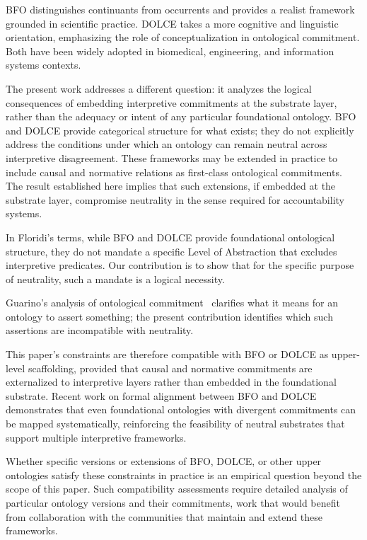 BFO distinguishes continuants from occurrents
and provides a realist framework grounded in scientific practice.
DOLCE takes a more cognitive and linguistic orientation,
emphasizing the role of conceptualization in ontological commitment.
Both have been widely adopted in biomedical, engineering,
and information systems contexts.

The present work addresses a different question:
it analyzes the logical consequences
of embedding interpretive commitments at the substrate layer,
rather than the adequacy or intent
of any particular foundational ontology.
BFO and DOLCE provide categorical structure for what exists;
they do not explicitly address the conditions under which
an ontology can remain neutral across interpretive disagreement.
These frameworks may be extended in practice
to include causal and normative relations
as first-class ontological commitments.
The result established here
implies that such extensions, if embedded at the substrate layer,
compromise neutrality in the sense required for accountability systems.

In Floridi's terms, while BFO and DOLCE provide
foundational ontological structure,
they do not mandate a specific Level of Abstraction
that excludes interpretive predicates.
Our contribution is to show that for the
specific purpose of neutrality,
such a mandate is a logical necessity.

Guarino's analysis of ontological commitment~\citep{guarino2009ontology}
clarifies what it means for an ontology to assert something;
the present contribution identifies which such assertions
are incompatible with neutrality.

This paper's constraints are therefore compatible
with BFO or DOLCE
as upper-level scaffolding,
provided that causal and normative commitments are externalized
to interpretive layers rather than embedded in the foundational substrate.
Recent work on formal alignment between BFO and DOLCE~\citep{masolo2025alignment}
demonstrates that even foundational ontologies with divergent commitments
can be mapped systematically,
reinforcing the feasibility of neutral substrates
that support multiple interpretive frameworks.

Whether specific versions or extensions of BFO, DOLCE,
or other upper ontologies satisfy these constraints in practice
is an empirical question beyond the scope of this paper.
Such compatibility assessments require detailed analysis
of particular ontology versions and their commitments,
work that would benefit from collaboration with the communities
that maintain and extend these frameworks.


